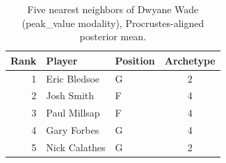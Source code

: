 \begin{table}[htbp]
  \centering\small
  \begin{tabular}{rllc}
    \toprule
    Rank & Player & Position & Archetype \\
    \midrule
    1 & Eric Bledsoe & G & 2 \\
    2 & Josh Smith & F & 4 \\
    3 & Paul Millsap & F & 4 \\
    4 & Gary Forbes & G & 4 \\
    5 & Nick Calathes & G & 2 \\
    \bottomrule
  \end{tabular}
  \caption{Five nearest neighbors of Dwyane Wade (peak_value modality), Procrustes-aligned posterior mean.}
  \label{tab:Dwyane_Wade_neighbors_peak_value}
\end{table}

